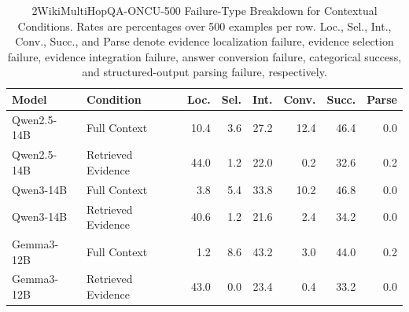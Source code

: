 \begin{table}[!t]
\renewcommand{\arraystretch}{1.10}
\caption{2WikiMultiHopQA-ONCU-500 Failure-Type Breakdown for Contextual Conditions. Rates are percentages over 500 examples per row. Loc., Sel., Int., Conv., Succ., and Parse denote evidence localization failure, evidence selection failure, evidence integration failure, answer conversion failure, categorical success, and structured-output parsing failure, respectively.}
\label{tab:twowiki500_failure_breakdown}
\centering
\scriptsize
\setlength{\tabcolsep}{3pt}
\begin{tabular}{llrrrrrr}
\toprule
Model & Condition & Loc. & Sel. & Int. & Conv. & Succ. & Parse \\
\midrule
Qwen2.5-14B & Full Context & 10.4 & 3.6 & 27.2 & 12.4 & 46.4 & 0.0 \\
Qwen2.5-14B & Retrieved Evidence & 44.0 & 1.2 & 22.0 & 0.2 & 32.6 & 0.2 \\
Qwen3-14B & Full Context & 3.8 & 5.4 & 33.8 & 10.2 & 46.8 & 0.0 \\
Qwen3-14B & Retrieved Evidence & 40.6 & 1.2 & 21.6 & 2.4 & 34.2 & 0.0 \\
Gemma3-12B & Full Context & 1.2 & 8.6 & 43.2 & 3.0 & 44.0 & 0.2 \\
Gemma3-12B & Retrieved Evidence & 43.0 & 0.0 & 23.4 & 0.4 & 33.2 & 0.0 \\
\bottomrule
\end{tabular}
\end{table}

